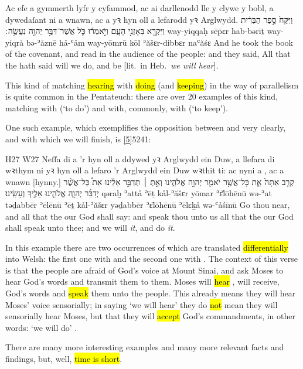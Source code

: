 \begin{example}{2}{24}{7}{}{}
	\quoling
	{Ac efe a gymmerth lyfr y cyfammod, ac ai darllenodd lle y clywe y bobl, a dywedaſant ni a wnawn, ac a  yꝛ hyn oll a lefarodd yꝛ Arglwydd.}
	{וַיִּקַּח֙ סֵ֣פֶר הַבְּרִ֔ית וַיִּקְרָ֖א בְּאָזְנֵ֣י הָעָ֑ם וַיֹּ֣אמְר֔וּ כֹּ֛ל אֲשֶׁר־דִּבֶּ֥ר יְהוָ֖ה נַעֲשֶׂ֥ה ׃}
	{way-yiqqaḥ sēp̄ɛr hab-bərīṯ way-yiqrå bə-ʾåznē hå-ʿåm way-yōmrū kōl ʾăšɛr-dibbɛr {\YHWH} naʿăśɛ }
	{And he took the book of the covenant, and read in the audience of the people: and they said, All that the {\LORD} hath said will we do, and be  [lit.\ in Heb.~\textit{we will hear}].}
\end{example}

\begin{paper}
	This kind of matching \hl{hearing} with \hl{doing} (and \hl{keeping}) in the way of parallelism is quite common in the Pentateuch: there are over 20 examples of this kind, matching  with  (‘to do’) and with, commonly, with  (‘to keep’).

	{\click} One such example, which exemplifies the opposition between  and  very clearly, and with which we will finish, is \vref{5}{5}{24}{1}:
\end{paper}

\begin{example}{5}{5}{24}{1}{H27 W27}
	\quoling
	{Neſſa di a  'r hyn oll a ddywed yꝛ Arglwydd ein Duw, a llefara di wꝛthym ni yꝛ hyn oll a lefaro 'r Arglwydd ein Duw wꝛthit ti: ac nyni a , ac a wnawn [hynny.]}
	{קְרַ֤ב אַתָּה֙  אֵ֛ת כָּל־אֲשֶׁ֥ר יֹאמַ֖ר יְהוָ֣ה אֱלֹהֵ֑ינוּ וְאַ֣תְּ ׀ תְּדַבֵּ֣ר אֵלֵ֗ינוּ אֵת֩ כָּל־אֲשֶׁ֨ר יְדַבֵּ֜ר יְהוָ֧ה אֱלֹהֵ֛ינוּ אֵלֶ֖יךָ  וְעָשִֽׂינוּ׃}
	{qəraḇ ʾattå  ʾēṯ kål-ʾăšɛr yōmar {\YHWH} ʾɛ̆lōhēnū wə-ʾat təḏabbēr ʾēlēnū ʾēṯ kål-ʾăšɛr yəḏabbēr {\YHWH} ʾɛ̆lōhēnū ʾēlɛḵå  wə-ʿåśīnū}
	{Go thou near, and  all that the {\LORD} our God shall say: and speak thou unto us all that the {\LORD} our God shall speak unto thee; and we will  \textit{it}, and do \textit{it}.}
\end{example}
\begin{paper}
	\explain In this example there are two occurrences of {\shama} which are translated \hl{differentially} into Welsh: the first one with  and the second one with . The context of this verse is that the people are afraid of God's voice at Mount Sinai, and ask Moses to hear God's words and transmit them to them. Moses will \hl{hear} , will receive, God's words and \hl{speak}  them unto the people. This already means they will hear Moses' voice sensorially; in saying ‘we will hear’  they do \hl{not} mean they will sensorially hear Moses, but that they will \hl{accept} God's commandments, in other words: ‘we will do’ .
\end{paper}

\begin{paper}
	There are many more interesting examples and many more relevant facts and findings, but, well, \hl{time is short}.
\end{paper}
